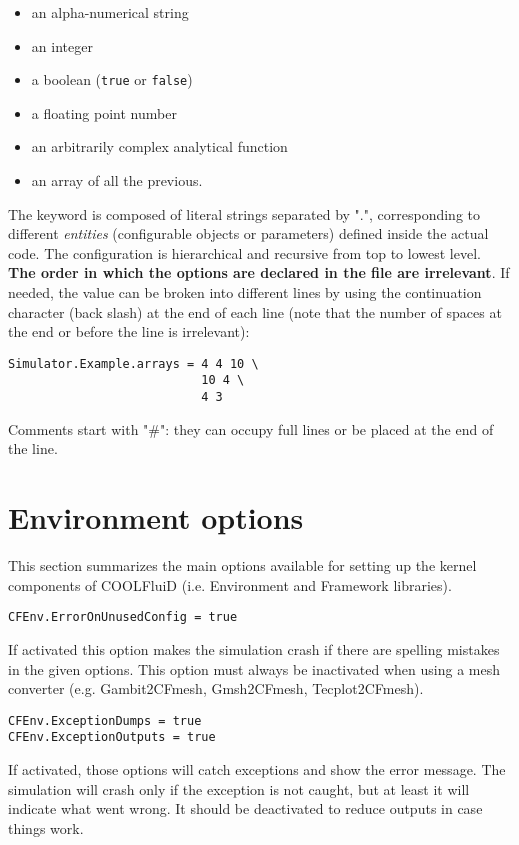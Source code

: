 \documentclass[11pt]{article}
\begin{document}
\begin{itemize}
\item
  an alpha-numerical string
\item
  an integer
\item 
  a boolean (\texttt{true} or \texttt{false})
\item
  a floating point number
\item
  an arbitrarily complex analytical function
\item
  an array of all the previous.
\end{itemize}
The keyword is composed of literal strings separated by ".",
corresponding to different \textit{entities} (configurable
objects or parameters) defined inside the actual code. The
configuration is hierarchical and recursive from top to lowest
level. {\bf The order in which the options are declared in the file are
  irrelevant}. If needed, the value can be broken into different lines by using the continuation character (back slash) 
at the end of each line (note that the number of spaces at the end or
before the line is irrelevant):
\vspace{-0.2cm}
\begin{verbatim}
Simulator.Example.arrays = 4 4 10 \
                           10 4 \
                           4 3
\end{verbatim}
Comments start with "\#": they can occupy full lines or be placed at the end of the line.

\section{Environment options}

This section summarizes the main options available for setting up the kernel components of COOLFluiD (i.e. Environment and Framework libraries).

\begin{verbatim}
CFEnv.ErrorOnUnusedConfig = true
\end{verbatim}
If activated this option makes the simulation crash if there are spelling mistakes in the given options. This option must always be inactivated when using a mesh converter (e.g. Gambit2CFmesh, Gmsh2CFmesh, Tecplot2CFmesh).

\begin{verbatim}
CFEnv.ExceptionDumps = true
CFEnv.ExceptionOutputs = true
\end{verbatim}
If activated, those options will catch exceptions and show the error message. The simulation will crash only if the exception is not caught, but at least it will indicate what went wrong. It should be deactivated to reduce outputs in case things work.
\end{document}

